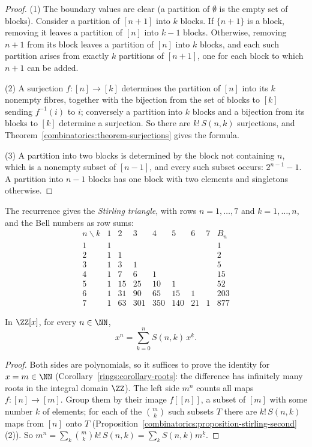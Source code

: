 \begin{proof}
(1) The boundary values are clear (a partition of $\emptyset$ is the empty set of blocks). Consider a partition of $[n + 1]$ into $k$ blocks. If $\{n + 1\}$ is a block, removing it leaves a partition of
$[n]$ into $k - 1$ blocks. Otherwise, removing $n + 1$ from its block leaves a partition of $[n]$ into $k$ blocks, and each such partition arises from exactly $k$ partitions of $[n + 1]$, one for each block
to which $n + 1$ can be added.

(2) A surjection $f \colon [n] \to [k]$ determines the partition of $[n]$ into its $k$ nonempty fibres, together with the bijection from the set of blocks to $[k]$ sending $f^{-1}(i)$ to $i$; conversely a
partition into $k$ blocks and a bijection from its blocks to $[k]$ determine a surjection. So there are $k!\,S(n, k)$ surjections, and Theorem~\ref{combinatorics:theorem-surjections} gives the formula.

(3) A partition into two blocks is determined by the block not containing $n$, which is a nonempty subset of $[n - 1]$, and every such subset occurs: $2^{n-1} - 1$. A partition into $n - 1$ blocks has
one block with two elements and singletons otherwise.
\end{proof}

The recurrence gives the \emph{Stirling triangle}, with rows $n = 1, \ldots, 7$ and $k = 1, \ldots, n$, and the Bell numbers as row sums:
\[
\begin{array}{c|ccccccc|c}
n \backslash k & 1 & 2 & 3 & 4 & 5 & 6 & 7 & B_n \\ \hline
1 & 1 & & & & & & & 1 \\
2 & 1 & 1 & & & & & & 2 \\
3 & 1 & 3 & 1 & & & & & 5 \\
4 & 1 & 7 & 6 & 1 & & & & 15 \\
5 & 1 & 15 & 25 & 10 & 1 & & & 52 \\
6 & 1 & 31 & 90 & 65 & 15 & 1 & & 203 \\
7 & 1 & 63 & 301 & 350 & 140 & 21 & 1 & 877
\end{array}
\]

\begin{theorem}\label{combinatorics:theorem-powers-falling}
In $\ZZ[x]$, for every $n \in \NN$,
\[
x^n = \sum_{k=0}^{n}S(n, k)\,x^{\underline{k}} .
\]
\end{theorem}

\begin{proof}
Both sides are polynomials, so it suffices to prove the identity for $x = m \in \NN$ (Corollary~\ref{rings:corollary-roots}: the difference has infinitely many roots in the integral domain $\ZZ$). The left
side $m^n$ counts all maps $f \colon [n] \to [m]$. Group them by their image $f[[n]]$, a subset of $[m]$ with some number $k$ of elements; for each of the $\binom{m}{k}$ such subsets $T$ there are
$k!\,S(n, k)$ maps from $[n]$ onto $T$ (Proposition~\ref{combinatorics:proposition-stirling-second}(2)). So $m^n = \sum_k\binom{m}{k}k!\,S(n, k) = \sum_kS(n, k)m^{\underline{k}}$.
\end{proof}

